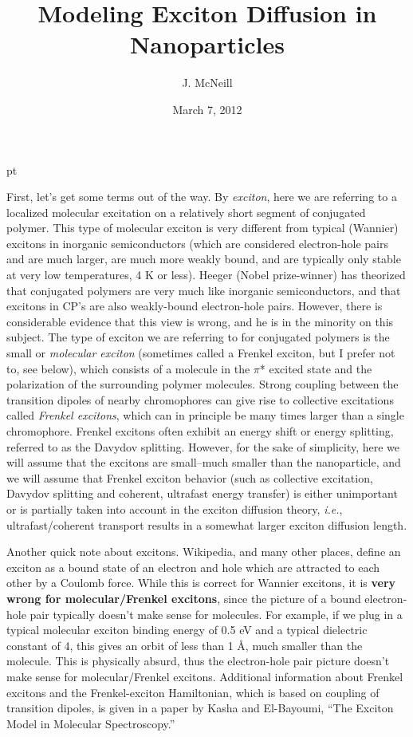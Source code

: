 \documentclass[12pt]{article}
\title{Modeling Exciton Diffusion in Nanoparticles}
\author{J. McNeill}
\date{March 7, 2012}
\begin{document}
\maketitle


  pt

\noindent First, let's get some terms out of the way.  By {\em
  exciton}, here we are referring to a localized molecular excitation
on a relatively short segment of conjugated polymer.  This type of
molecular exciton is very different from typical (Wannier) excitons in
inorganic semiconductors (which are considered electron-hole pairs and
are much larger, are much more weakly bound, and are typically only
stable at very low temperatures, 4 K or less).  Heeger (Nobel
prize-winner) has theorized that conjugated polymers are very much
like inorganic semiconductors, and that excitons in CP's are also
weakly-bound electron-hole pairs. However, there is considerable
evidence that this view is wrong, and he is in the minority on this
subject.  The type of exciton we are referring to for conjugated
polymers is the small or {\em molecular exciton} (sometimes called a
Frenkel exciton, but I prefer not to, see below), which consists of a
molecule in the $\pi$* excited state and the polarization of the
surrounding polymer molecules.  Strong coupling between the transition
dipoles of nearby chromophores can give rise to collective excitations
called {\em Frenkel excitons}, which can in principle be many times
larger than a single chromophore.  Frenkel excitons often exhibit an
energy shift or energy splitting, referred to as the Davydov
splitting.  However, for the sake of simplicity, here we will assume
that the excitons are small--much smaller than the nanoparticle, and
we will assume that Frenkel exciton behavior (such as collective
excitation, Davydov splitting and coherent, ultrafast energy transfer)
is either unimportant or is partially taken into account in the
exciton diffusion theory, {\it i.e.}, ultrafast/coherent transport
results in a somewhat larger exciton diffusion length.

Another quick note about excitons.  Wikipedia, and many other places,
define an exciton as a bound state of an electron and hole which are
attracted to each other by a Coulomb force.  While this is correct for
Wannier excitons, it is {\bf very wrong for molecular/Frenkel
  excitons}, since the picture of a bound electron-hole pair typically
doesn't make sense for molecules.  For example, if we plug in a
typical molecular exciton binding energy of 0.5 eV and a typical
dielectric constant of 4, this gives an orbit of less than 1 \AA, much
smaller than the molecule. This is physically absurd, thus the
electron-hole pair picture doesn't make sense for molecular/Frenkel
excitons.  Additional information about Frenkel excitons and the
Frenkel-exciton Hamiltonian, which is based on coupling of transition
dipoles, is given in a paper by Kasha and El-Bayoumi, ``The Exciton
Model in Molecular Spectroscopy.''
\end{document}
